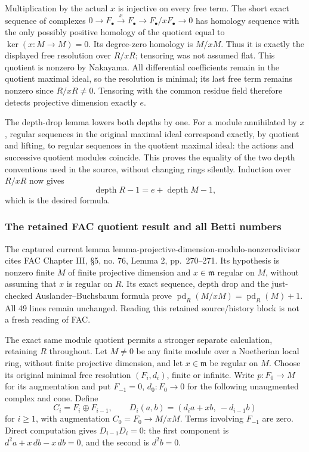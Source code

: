 Multiplication by the actual \(x\) is injective on every free term. The short exact sequence of complexes \(0\to F_\bullet\xrightarrow{x}F_\bullet\to F_\bullet/xF_\bullet\to0\) has homology sequence with the only possibly positive homology of the quotient equal to \(\ker(x:M\to M)=0\). Its degree-zero homology is \(M/xM\). Thus it is exactly the displayed free resolution over \(R/xR\); tensoring was not assumed flat. This quotient is nonzero by Nakayama. All differential coefficients remain in the quotient maximal ideal, so the resolution is minimal; its last free term remains nonzero since \(R/xR\ne0\). Tensoring with the common residue field therefore detects projective dimension exactly \(e\).

The depth-drop lemma lowers both depths by one. For a module annihilated by \(x\), regular sequences in the original maximal ideal correspond exactly, by quotient and lifting, to regular sequences in the quotient maximal ideal: the actions and successive quotient modules coincide. This proves the equality of the two depth conventions used in the source, without changing rings silently. Induction over \(R/xR\) now gives \[
\operatorname{depth}R-1=e+\operatorname{depth}M-1,
\] which is the desired formula.

\subsubsection{The retained FAC quotient result and all Betti numbers}\label{algebra-proof-023-the-retained-fac-quotient-result-and-all-betti-numbers}

The captured current lemma lemma-projective-dimension-modulo-nonzerodivisor cites FAC Chapter III, §5, no. 76, Lemma 2, pp.~270--271. Its hypothesis is nonzero finite \(M\) of finite projective dimension and \(x\in\mathfrak m\) regular on \(M\), without assuming that \(x\) is regular on \(R\). Its exact sequence, depth drop and the just-checked Auslander--Buchsbaum formula prove \(\operatorname{pd}_R(M/xM)=\operatorname{pd}_R(M)+1\). All 49 lines remain unchanged. Reading this retained source/history block is not a fresh reading of FAC.

The exact same module quotient permits a stronger separate calculation, retaining \(R\) throughout. Let \(M\ne0\) be any finite module over a Noetherian local ring, without finite projective dimension, and let \(x\in\mathfrak m\) be regular on \(M\). Choose its original minimal free resolution \((F_i,d_i)\), finite or infinite. Write \(p:F_0\to M\) for its augmentation and put \(F_{-1}=0\), \(d_0:F_0\to0\) for the following unaugmented complex and cone. Define \[
C_i=F_i\oplus F_{i-1},\qquad
D_i(a,b)=(d_i a+x b,\ -d_{i-1}b)
\] for \(i\ge1\), with augmentation \(C_0=F_0\to M/xM\). Terms involving \(F_{-1}\) are zero. Direct computation gives \(D_{i-1}D_i=0\): the first component is \(d^2a+x\,db-x\,db=0\), and the second is \(d^2b=0\).

